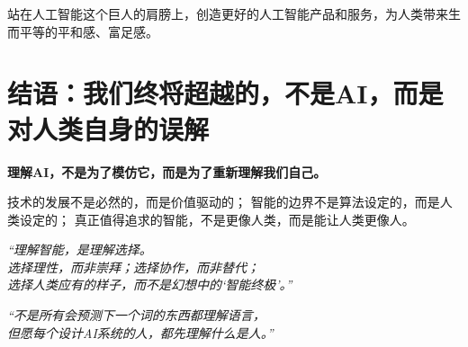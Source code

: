 站在人工智能这个巨人的肩膀上，创造更好的人工智能产品和服务，为人类带来生而平等的平和感、富足感。


\section*{结语：我们终将超越的，不是AI，而是对人类自身的误解}

\textbf{理解AI，不是为了模仿它，而是为了重新理解我们自己。}

技术的发展不是必然的，而是价值驱动的；  
智能的边界不是算法设定的，而是人类设定的；  
真正值得追求的智能，不是更像人类，而是能让人类更像人。

\begin{center}
\textit{
“理解智能，是理解选择。\\
选择理性，而非崇拜；选择协作，而非替代；\\
选择人类应有的样子，而不是幻想中的‘智能终极’。”}
\end{center}

\begin{center}
\textit{
“不是所有会预测下一个词的东西都理解语言，\\
但愿每个设计AI系统的人，都先理解什么是人。”\\
}
\end{center}

\nocite{*}
\printbibliography[heading=bibintoc, title=\ebibname]
\appendix

\newpage